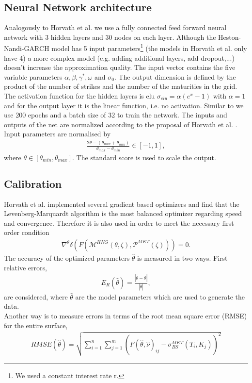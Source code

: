 \documentclass{article}
\begin{document}
\subsection{Neural Network architecture}\label{sec:NN_arch}
Analogously to Horvath et al. \cite{Blanka} we use a fully connected feed forward neural network with 3 hidden layers and 30 nodes on each layer. Although the Heston-Nandi-GARCH model has 5 input parameters\footnote{We used a constant interest rate r.} (the models in Horvath et al. \cite{Blanka} only have 4) a more complex model (e.g. adding additional layers, add dropout,...) doesn't increase the approximation quality. \newline
The input vector contains the five variable parameters $\alpha, \beta, \gamma^*, \omega$ and $\sigma_0$. The output dimension is defined by the product of the number of strikes and the number of the maturities in the grid. \newline
The activation function for the  hidden layers is elu $\sigma_{elu} = \alpha(e^x-1)$ with $\alpha = 1$ and for the output layer it is the linear function, i.e. no activation. \newline
Similar to \cite{Blanka} we use 200 epochs and a batch size of 32 to train the network. \newline
The inputs and outputs of the net are normalized according to the proposal of Horvath et al. \cite{Blanka}. Input parameters are normalised by 
\begin{align*}
    \frac{2\theta-(\theta_{max}+\theta_{min})}{\theta_{max}-\theta_{min}} \in [-1, 1],
\end{align*}
where $\theta \in [\theta_{min},\theta_{max}]$. The standard score is used to scale the output.   
\subsection{Calibration}
Horvath et al. \cite{Blanka} implemented several gradient based optimizers and find that the Levenberg-Marquardt algorithm is the most balanced optimizer regarding speed and convergence. Therefore it is also used in order to meet the necessary first order condition
\begin{align*}
    \nabla^{\theta}\delta(F(\mathcal{M}^{HNG}(\theta,\zeta), \mathcal{P}^{MKT}(\zeta))) = 0.
\end{align*}
The accuracy of the optimized parameters $\hat{\theta}$ is measured in two ways. First relative errors,
\begin{align*}
    E_R(\hat{\theta}) = \frac{|\hat{\theta}-\bar{\theta}|}{|\bar{\theta}|}, 
\end{align*}
are considered, where $\bar{\theta}$ are the model parameters which are used to generate the data. \\
Another way is to measure errors in terms of the root mean square error (RMSE) for the entire surface,
\begin{align*}
    RMSE(\hat{\theta}) = \sqrt{\sum_{i=1}^n\sum_{j=1}^m(F(\hat{\theta}, \hat{\nu})_{ij}-\sigma_{BS}^{MKT}(T_i,K_j))^2}
\end{align*}
\end{document}
